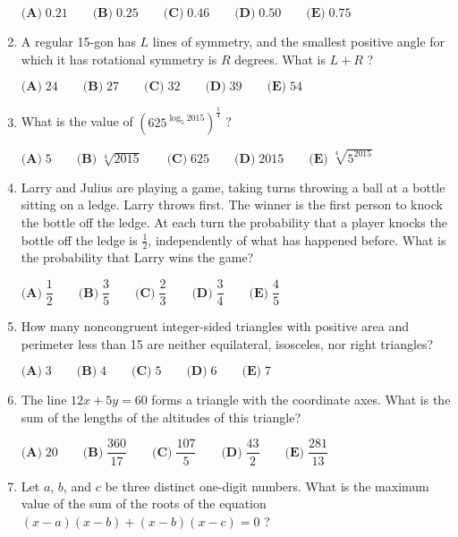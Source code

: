 \documentclass{article}
\begin{document}
\begin{enumerate}[label=\arabic*., itemsep=0.5em]
\(\textbf{(A)}\; 0.21 \qquad\textbf{(B)}\; 0.25 \qquad\textbf{(C)}\; 0.46 \qquad\textbf{(D)}\; 0.50 \qquad\textbf{(E)}\; 0.75\)\par \vspace{0.5em}\item A regular 15-gon has \(L\) lines of symmetry, and the smallest positive angle for which it has rotational symmetry is \(R\) degrees. What is \(L+R\) ?

\(\textbf{(A)}\; 24 \qquad\textbf{(B)}\; 27 \qquad\textbf{(C)}\; 32 \qquad\textbf{(D)}\; 39 \qquad\textbf{(E)}\; 54\)\par \vspace{0.5em}\item What is the value of \((625^{\log_5 2015})^{\frac{1}{4}}\) ?

\(\textbf{(A)}\; 5 \qquad\textbf{(B)}\; \sqrt[4]{2015} \qquad\textbf{(C)}\; 625 \qquad\textbf{(D)}\; 2015 \qquad\textbf{(E)}\; \sqrt[4]{5^{2015}}\)\par \vspace{0.5em}\item Larry and Julius are playing a game, taking turns throwing a ball at a bottle sitting on a ledge. Larry throws first. The winner is the first person to knock the bottle off the ledge. At each turn the probability that a player knocks the bottle off the ledge is \(\tfrac{1}{2}\), independently of what has happened before. What is the probability that Larry wins the game?

\(\textbf{(A)}\; \dfrac{1}{2} \qquad\textbf{(B)}\; \dfrac{3}{5} \qquad\textbf{(C)}\; \dfrac{2}{3} \qquad\textbf{(D)}\; \dfrac{3}{4} \qquad\textbf{(E)}\; \dfrac{4}{5}\)\par \vspace{0.5em}\item How many noncongruent integer-sided triangles with positive area and perimeter less than 15 are neither equilateral, isosceles, nor right triangles?

\(\textbf{(A)}\; 3 \qquad\textbf{(B)}\; 4 \qquad\textbf{(C)}\; 5 \qquad\textbf{(D)}\; 6 \qquad\textbf{(E)}\; 7\)\par \vspace{0.5em}\item The line \(12x+5y=60\) forms a triangle with the coordinate axes. What is the sum of the lengths of the altitudes of this triangle?

\(\textbf{(A)}\; 20 \qquad\textbf{(B)}\; \dfrac{360}{17} \qquad\textbf{(C)}\; \dfrac{107}{5} \qquad\textbf{(D)}\; \dfrac{43}{2} \qquad\textbf{(E)}\; \dfrac{281}{13}\)\par \vspace{0.5em}\item Let \(a\), \(b\), and \(c\) be three distinct one-digit numbers. What is the maximum value of the sum of the roots of the equation \((x-a)(x-b)+(x-b)(x-c)=0\) ?


\end{enumerate}
\end{document}
